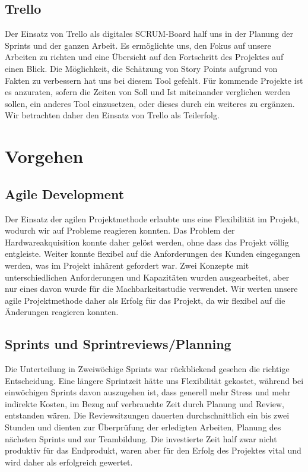 \subsection{Trello}
Der Einsatz von Trello als digitales SCRUM-Board half uns in der Planung der Sprints und der ganzen Arbeit. Es ermöglichte uns, den Fokus auf unsere Arbeiten zu richten und eine Übersicht auf den Fortschritt des Projektes auf einen Blick. Die Möglichkeit, die Schätzung von Story Points aufgrund von Fakten zu verbessern hat uns bei diesem Tool gefehlt. Für kommende Projekte ist es anzuraten, sofern die Zeiten von Soll und Ist miteinander verglichen werden sollen, ein anderes Tool einzusetzen, oder dieses durch ein weiteres zu ergänzen. Wir betrachten daher den Einsatz von Trello als Teilerfolg.

\section{Vorgehen}
\subsection{Agile Development}
Der Einsatz der agilen Projektmethode erlaubte uns eine Flexibilität im Projekt, wodurch wir auf Probleme reagieren konnten. Das Problem der Hardwareakquisition konnte daher gelöst werden, ohne dass das Projekt völlig entgleiste. Weiter konnte flexibel auf die Anforderungen des Kunden eingegangen werden, was im Projekt inhärent gefordert war. Zwei Konzepte mit unterschiedlichen Anforderungen und Kapazitäten wurden ausgearbeitet, aber nur eines davon wurde für die Machbarkeitsstudie verwendet. Wir werten unsere agile Projektmethode daher als Erfolg für das Projekt, da wir flexibel auf die Änderungen reagieren konnten.

\subsection{Sprints und Sprintreviews/Planning}
Die Unterteilung in Zweiwöchige Sprints war rückblickend gesehen die richtige Entscheidung. Eine längere Sprintzeit hätte uns Flexibilität gekostet, während bei einwöchigen Sprints davon auszugehen ist, dass generell mehr Stress und mehr indirekte Kosten, im Bezug auf verbrauchte Zeit durch Planung und Review, entstanden wären. Die Reviewsitzungen dauerten durchschnittlich ein bis zwei Stunden und dienten zur Überprüfung der erledigten Arbeiten, Planung des nächsten Sprints und zur Teambildung. Die investierte Zeit half zwar nicht produktiv für das Endprodukt, waren aber für den Erfolg des Projektes vital und wird daher als erfolgreich gewertet.


